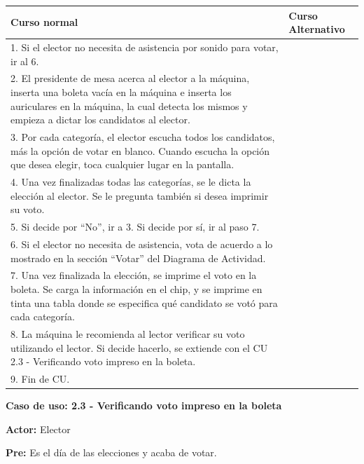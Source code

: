 \begin{table}[h!]
	
 \begin{tabular}{|p{7.5cm} | p{7.5cm}|} 
 \hline
 \textbf{Curso normal} & \textbf{Curso Alternativo} \\
 \hline
1. Si el elector no necesita de asistencia por sonido para votar, ir al 6. & \\
\hline

2. El presidente de mesa acerca al elector a la máquina, inserta una boleta vacía en la máquina e inserta los auriculares en la máquina, la cual detecta los mismos y empieza a dictar los candidatos al elector. & \\
\hline

3. Por cada categoría, el elector escucha todos los candidatos, más la opción de votar en blanco. Cuando escucha la opción que desea elegir, toca cualquier lugar en la pantalla. & \\
\hline

4. Una vez finalizadas todas las categorías, se le dicta la elección al elector. Se le pregunta también si desea imprimir su voto. & \\
\hline

5. Si decide por “No”, ir a 3. Si decide por sí, ir al paso 7. & \\
\hline

6. Si el elector no necesita de asistencia, vota de acuerdo a lo mostrado en la sección “Votar” del Diagrama de Actividad. & \\
\hline

7. Una vez finalizada la elección, se imprime el voto en la boleta. Se carga la información en el chip, y se imprime en tinta una tabla donde se especifica qué candidato se votó para cada categoría. & \\
\hline

8. La máquina le recomienda al lector verificar su voto utilizando el lector. Si decide hacerlo, se extiende con el CU 2.3 - Verificando voto impreso en la boleta. & \\
\hline

9. Fin de CU. & \\
\hline

\end{tabular}
\end{table}
\textbf{Caso de uso: 2.3 - Verificando voto impreso en la boleta}

\textbf{Actor:} Elector

\textbf{Pre:} Es el día de las elecciones y acaba de votar.

